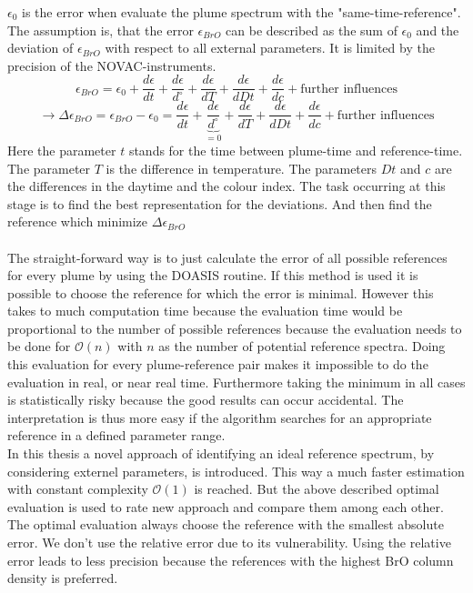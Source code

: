 \documentclass  [
  paper    = a4,
  BCOR     = 10mm,
  twoside,
  fontsize = 12pt,
  fleqn,
  toc      = bibnumbered,
  toc      = listofnumbered,
  numbers  = noendperiod,
  headings = normal,
  listof   = leveldown,
  version  = 3.03
]                                       {scrreprt}
\begin{document}
	$\epsilon_{0}$ is the  error when evaluate the plume spectrum with the "same-time-reference".
	The assumption is, that the  error $\epsilon_{BrO}$ can be described as the sum of $\epsilon_{0}$ and the deviation of $\epsilon_{BrO}$ with respect to all external parameters. It is limited by the precision of the NOVAC-instruments.
	\begin{equation}
		\epsilon_{BrO} =  \epsilon_{0}+\frac{d\epsilon}{dt}+\frac{d\epsilon}{d ^{\circ}}+\frac{d\epsilon}{dT}+\frac{d\epsilon}{dDt} +\frac{d\epsilon}{dc} + \text{further influences} 
	\end{equation}
	\begin{equation}
		\rightarrow \Delta \epsilon_{BrO} =\epsilon_{BrO} - \epsilon_{0} =\frac{d\epsilon}{dt}+\underbrace{\frac{d\epsilon}{d ^{\circ}}}_{=0}+\frac{d\epsilon}{dT}+\frac{d\epsilon}{dDt} +\frac{d\epsilon}{dc} + \text{further influences}
		\label{calc:err}
	\end{equation}
	Here the parameter $t$ stands for the time between plume-time and reference-time. The parameter $T$ is the difference in temperature. The parameters $Dt$ and $c$ are the differences in the daytime and the colour index.
	The task occurring at this stage is to find the best representation for the deviations. And then find the reference which minimize $\Delta \epsilon_{BrO} $\\
	\\
	The straight-forward way is to just calculate the  error of all possible references for every plume by using the DOASIS routine. If this method is used it is possible to choose the reference for which the  error is minimal. However this takes to much computation time because the evaluation time would be proportional to the number of possible references because the evaluation needs to be done for $\mathcal{O}(n)$ with $n$ as the number of potential reference spectra. Doing this evaluation for every plume-reference pair makes it impossible to do the evaluation in real, or near real time.
	Furthermore taking the minimum in all cases is statistically risky because the good results can occur accidental. The interpretation is thus more easy if the algorithm searches for an appropriate reference in a defined parameter range.\\
	In this thesis a novel approach of identifying an ideal reference spectrum, by considering externel parameters, is introduced. This way a much faster estimation with constant complexity $\mathcal{O}(1)$ is reached.
	But the above described optimal evaluation is used to rate new approach and compare them among each other. The optimal evaluation always choose the reference with the smallest absolute error. We don't use the relative error due to its vulnerability. Using the relative error leads to less precision because the references with the highest BrO column density is preferred.\\
\end{document}
